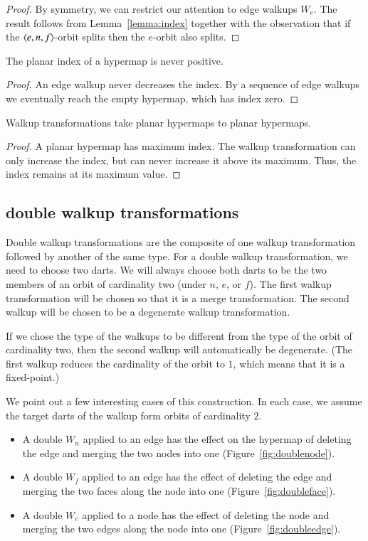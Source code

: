 \begin{proof}  By symmetry, we can restrict our attention to 
edge walkups $W_e$.  The result follows from  Lemma~\ref{lemma:index} together
with the observation that if the $\langle e,n,f\rangle$-orbit splits then
the $e$-orbit also splits.
\end{proof}


\begin{lemma}  The planar index
of a hypermap is never positive.
\end{lemma}

\begin{proof}  An edge walkup never decreases the index.  By a sequence
of edge walkups we eventually reach the empty hypermap, which has
index zero.
\end{proof}


\begin{lemma} Walkup transformations take planar hypermaps to planar
hypermaps.
\end{lemma}

\begin{proof}  
A planar hypermap has maximum index.  The walkup
transformation can only increase the index, but can never increase
it above its maximum.  Thus, the index remains at its maximum value.
\end{proof}


\subsection{double walkup transformations}

Double walkup transformations are the composite of one walkup
transformation followed by another of the same type.  For a double
walkup transformation, we need to choose two darts.  We will always
choose both darts to be the two members of an orbit of cardinality
two (under $n$, $e$, or $f$).  The first walkup transformation will be
chosen so that it is a merge transformation.  The second walkup will
be chosen to be a degenerate walkup transformation.

If we chose the type of the walkups to be different from the type of
the orbit of cardinality two, then the second walkup will
automatically be degenerate.  (The first walkup reduces the
cardinality of the orbit to $1$, which means that it is a
fixed-point.)

We point out a few interesting cases of this construction. In each
case, we assume the target darts of the walkup form orbits of
cardinality $2$.
\begin{itemize}
    \item A double $W_n$ applied to an edge has the effect on
    the hypermap of deleting the edge and merging the two nodes into
    one (Figure~\ref{fig:doublenode}). 
    \item A double $W_f$ applied to an edge has the effect of
    deleting the edge and merging the two faces along the node into
    one (Figure~\ref{fig:doubleface}).
    \item A double $W_e$ applied to a node has the effect of
    deleting the node and merging the two edges along the node into
    one (Figure~\ref{fig:doubleedge}).
\end{itemize}


